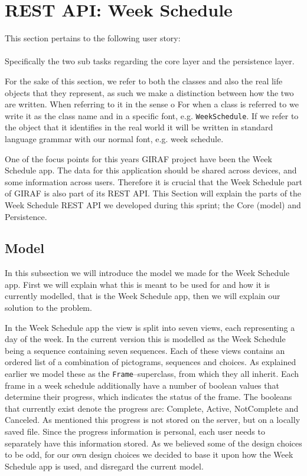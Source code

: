 \section{REST API: Week Schedule}\label{sec:restws}
This section pertains to the following user story: \\
 \\
Specifically the two sub tasks regarding the core layer and the persistence layer.

For the sake of this section, we refer to both the classes and also the real life objects that they represent, as such we make a distinction between how the two are written.
When referring to it in the sense o
For when a class is referred to we write it as the class name and in a specific font, e.g. \texttt{WeekSchedule}.
If we refer to the object that it identifies in the real world it will be written in standard language grammar with our normal font, e.g. week schedule.

\noindent
One of the focus points for this years GIRAF project have been the Week Schedule app.
The data for this application should be shared across devices, and some information across users.
Therefore it is crucial that the Week Schedule part of GIRAF is also part of its REST API.
This Section will explain the parts of the Week Schedule REST API we developed during this sprint; the Core (model) and Persistence. 

\subsection{Model}
In this subsection we will introduce the model we made for the Week Schedule app.
First we will explain what this is meant to be used for and how it is currently modelled, that is the Week Schedule app, then we will explain our solution to the problem. 

In the Week Schedule app the view is split into seven views, each representing a day of the week.
In the current version this is modelled as the Week Schedule being a sequence containing seven sequences.
Each of these views contains an ordered list of a combination of pictograms, sequences and choices.
As explained earlier we model these as the \texttt{Frame}--superclass, from which they all inherit. %
Each frame in a week schedule additionally have a number of boolean values that determine their progress, which indicates the status of the frame. 
The booleans that currently exist denote the progress are: Complete, Active, NotComplete and Canceled. 
As mentioned this progress is not stored on the server, but on a locally saved file.
Since the progress information is personal, each user needs to separately have this information stored. 
As we believed some of the design choices to be odd, for our own design choices we decided to base it upon how the Week Schedule app is used, and disregard the current model.

